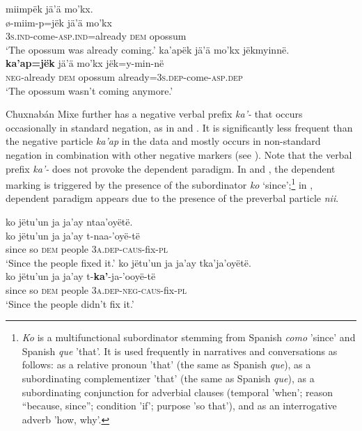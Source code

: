 \documentclass[output=paper,colorlinks,citecolor=brown,draft]{langscibook}
\begin{document}
\ea\label{ex:mix:9}
    \ea\label{ex:mix:9a}
        \glll miimpëk jä’ä mo’kx. \\
             ø-miim-p=jëk jä’ä mo’kx \\
             \textsc{3s.ind}{}-come-\textsc{asp.ind=}already \textsc{dem} opossum \\
        \glt ‘The opossum was already coming.’
    \ex\label{ex:mix:9b}
        \glll ka’apëk jä’ä mo’kx jëkmyinnë.\\ 
             \textbf{ka’ap=jëk} jä’ä mo’kx jëk=y-min-në \\
             \textsc{neg}{}-already \textsc{dem} opossum already=\textsc{3s.dep-}come-\textsc{asp.dep} \\
        \glt ‘The opossum wasn’t coming anymore.’
    \z
\z

Chuxnabán Mixe further has a negative verbal prefix \textit{ka’-} that occurs occasionally in standard negation, as in  and . It is significantly less frequent than the negative particle \textit{ka’ap} in the data and mostly occurs in non-standard negation in combination with other negative markers (see ). Note that the verbal prefix \textit{ka’-} does not provoke the dependent paradigm. In  and , the dependent marking is triggered by the presence of the subordinator \textit{ko} ‘since’;\footnote{\textit{Ko} is a multifunctional subordinator stemming from Spanish \textit{como} 'since' and Spanish \textit{que} 'that'. It is used frequently in narratives and conversations as follows: as a relative pronoun 'that' (the same as Spanish \textit{que}), as a subordinating complementizer 'that' (the same as Spanish \textit{que}), as a subordinating conjunction for adverbial clauses (temporal 'when'; reason “because, since”; condition 'if'; purpose 'so that'), and as an interrogative adverb 'how, why'.} in , dependent paradigm appears due to the presence of the preverbal particle \textit{nii}. 


 
\ea\label{ex:mix:10}
    \ea\label{ex:mix:10a}
        \glll ko jëtu’un ja ja’ay ntaa’oyëtë.\\
             ko jëtu’un ja ja’ay t-naa-’oyë-të \\
             since so \textsc{dem} people 3\textsc{a.dep-caus}{}-fix-\textsc{pl} \\
        \glt ‘Since the people fixed it.’ 
    \ex\label{ex:mix:10b}
        \glll ko jëtu’un ja ja’ay tka’ja’oyëtë. \\ 
             ko jëtu’un ja ja’ay t-\textbf{ka’}{}-ja-’ooyë-të \\
             since so \textsc{dem} people 3\textsc{a.dep-neg}{}-\textsc{caus-}fix-\textsc{pl} \\
        \glt ‘Since the people didn’t fix it.’
    \z
\z 
 
\end{document}
